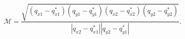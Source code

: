 \begin{equation}
\mathcal{M} = \frac{\sqrt{\left(q_{x1}-q_{x1}^*\right)\left(q_{y1}-q_{y1}^*\right)\left(q_{x2}-q_{x2}^*\right)\left(q_{y2}-q_{y2}^*\right)}}{\left|q_{x2} - q_{x1}^*\right|\left|q_{y2} - q_{y1}^*\right|}.
\end{equation}
